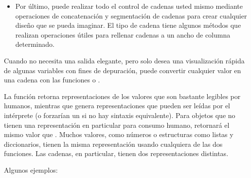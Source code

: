 \documentclass[a5paper,10pt,spanish]{sphinxmanual}
\begin{document}
\begin{itemize}
\item {} 
\sphinxAtStartPar
Por último, puede realizar todo el control de cadenas usted mismo mediante operaciones de concatenación y segmentación de cadenas para crear cualquier diseño que se pueda imaginar.  El tipo de cadena tiene algunos métodos que realizan operaciones útiles para rellenar cadenas a un ancho de columna determinado.

\end{itemize}

\sphinxAtStartPar
Cuando no necesita una salida elegante, pero solo desea una visualización rápida de algunas variables con fines de depuración, puede convertir cualquier valor en una cadena con las funciones  o .

\sphinxAtStartPar
La función  retorna representaciones de los valores que son bastante legibles por humanos, mientras que  genera representaciones que pueden ser leídas por el intérprete (o forzarían un  si no hay sintaxis equivalente).  Para objetos que no tienen una representación en particular para consumo humano,  retornará el mismo valor que .  Muchos valores, como números o estructuras como listas y diccionarios, tienen la misma representación usando cualquiera de las dos funciones.  Las cadenas, en particular, tienen dos representaciones distintas.

\sphinxAtStartPar
Algunos ejemplos:
\end{document}
